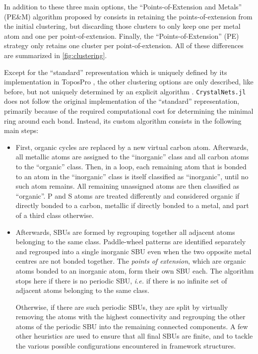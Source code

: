 \documentclass[main.tex]{subfiles}
\begin{document}
In addition to these three main options, the ``Points-of-Extension and Metals'' (PE\&M) algorithm proposed by \textcite{ProserpioPEM} consists in retaining the points-of-extension from the initial clustering, but discarding those clusters to only keep one per metal atom and one per point-of-extension. Finally, the ``Points-of-Extension'' (PE) strategy only retains one cluster per point-of-extension. All of these differences are summarized in \cref{fig:clustering}.


Except for the ``standard'' representation which is uniquely defined by its implementation in ToposPro \autocite{BlatovSimplify,BlatovCSD}, the other clustering options are only described, like before, but not uniquely determined by an explicit algorithm \autocite{IUPAC_SBU,OKeeffeSBU,OKeeffe,BlatovSimplify,MetalOxo,ProserpioPEM}. \texttt{CrystalNets.jl} does not follow the original implementation of the ``standard'' representation\autocite{BlatovCSD}, primarily because of the required computational cost for determining the minimal ring around each bond. Instead, its custom algorithm consists in the following main steps:
\begin{itemize}
	\item First, organic cycles are replaced by a new virtual carbon atom. Afterwards, all metallic atoms are assigned to the ``inorganic'' class and all carbon atoms to the ``organic'' class. Then, in a loop, each remaining atom that is bonded to an atom in the ``inorganic'' class is itself classified as ``inorganic'', until no such atom remains. All remaining unassigned atoms are then classified as ``organic''. P and S atoms are treated differently and considered organic if directly bonded to a carbon, metallic if directly bonded to a metal, and part of a third class otherwise.
	
	\item Afterwards, SBUs are formed by regrouping together all adjacent atoms belonging to the same class. Paddle-wheel patterns are identified separately and regrouped into a single inorganic SBU even when the two opposite metal centres are not bonded together. The \textit{points of extension}, which are organic atoms bonded to an inorganic atom, form their own SBU each. The algorithm stops here if there is no periodic SBU, \textit{i.e.} if there is no infinite set of adjacent atoms belonging to the same class.
	
	Otherwise, if there are such periodic SBUs, they are split by virtually removing the atoms with the highest connectivity and regrouping the other atoms of the periodic SBU into the remaining connected components. A few other heuristics are used to ensure that all final SBUs are finite, and to tackle the various possible configurations encountered in framework structures.
\end{itemize}
\end{document}
